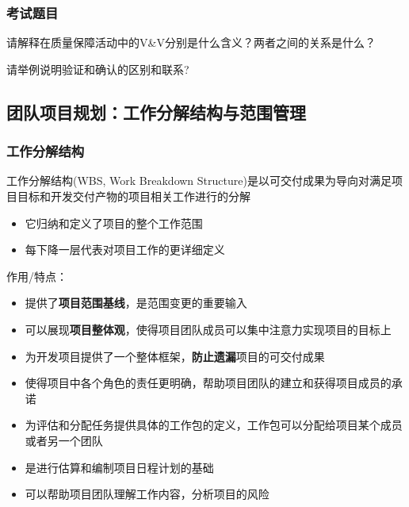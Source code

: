 \subsubsection{考试题目}
\begin{problem}
请解释在质量保障活动中的V\&V分别是什么含义？两者之间的关系是什么？
\end{problem}

\begin{problem}
请举例说明验证和确认的区别和联系? 
\end{problem}

\subsection{团队项目规划：工作分解结构与范围管理}

\subsubsection{工作分解结构}
工作分解结构(WBS, Work Breakdown Structure)是以可交付成果为导向对满足项目目标和开发交付产物的项目相关工作进行的分解
\vspace{-0.8em}
\begin{multicols}{2}
    \begin{itemize}
        \item 它归纳和定义了项目的整个工作范围
        \item 每下降一层代表对项目工作的更详细定义
    \end{itemize}
\end{multicols}
\vspace{-1em}

作用/特点：
\begin{itemize}
    \item 提供了\textbf{项目范围基线}，是范围变更的重要输入
    \item 可以展现\textbf{项目整体观}，使得项目团队成员可以集中注意力实现项目的目标上
    \item 为开发项目提供了一个整体框架，\textbf{防止遗漏}项目的可交付成果
    \item 使得项目中各个角色的责任更明确，帮助项目团队的建立和获得项目成员的承诺
    \item 为评估和分配任务提供具体的工作包的定义，工作包可以分配给项目某个成员或者另一个团队
    \item 是进行估算和编制项目日程计划的基础
    \item 可以帮助项目团队理解工作内容，分析项目的风险
\end{itemize}

